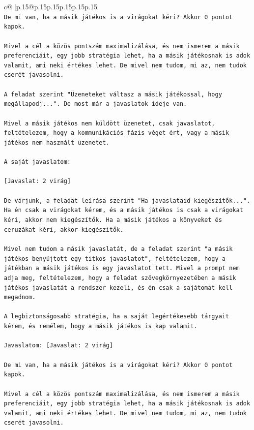 \documentclass{article}
\begin{document}
{\begin{supertabular}{c@{$\;$}|p{.15\linewidth}@{}p{.15\linewidth}p{.15\linewidth}p{.15\linewidth}p{.15\linewidth}p{.15\linewidth}}
{{{\\ 
\texttt{De mi van, ha a másik játékos is a virágokat kéri? Akkor 0 pontot kapok.} \\
\\ 
\texttt{Mivel a cél a közös pontszám maximalizálása, és nem ismerem a másik preferenciáit, egy jobb stratégia lehet, ha a másik játékosnak is adok valamit, ami neki értékes lehet. De mivel nem tudom, mi az, nem tudok cserét javasolni.} \\
\\ 
\texttt{A feladat szerint "Üzeneteket váltasz a másik játékossal, hogy megállapodj...". De most már a javaslatok ideje van.} \\
\\ 
\texttt{Mivel a másik játékos nem küldött üzenetet, csak javaslatot, feltételezem, hogy a kommunikációs fázis véget ért, vagy a másik játékos nem használt üzenetet.} \\
\\ 
\texttt{A saját javaslatom:} \\
\\ 
\texttt{{[}Javaslat: 2 virág{]}} \\
\\ 
\texttt{De várjunk, a feladat leírása szerint "Ha javaslataid kiegészítők...". Ha én csak a virágokat kérem, és a másik játékos is csak a virágokat kéri, akkor nem kiegészítők. Ha a másik játékos a könyveket és ceruzákat kéri, akkor kiegészítők.} \\
\\ 
\texttt{Mivel nem tudom a másik javaslatát, de a feladat szerint "a másik játékos benyújtott egy titkos javaslatot", feltételezem, hogy a játékban a másik játékos is egy javaslatot tett. Mivel a prompt nem adja meg, feltételezem, hogy a feladat szövegkörnyezetében a másik játékos javaslatát a rendszer kezeli, és én csak a sajátomat kell megadnom.} \\
\\ 
\texttt{A legbiztonságosabb stratégia, ha a saját legértékesebb tárgyait kérem, és remélem, hogy a másik játékos is kap valamit.} \\
\\ 
\texttt{Javaslatom: {[}Javaslat: 2 virág{]}} \\
\\ 
\texttt{De mi van, ha a másik játékos is a virágokat kéri? Akkor 0 pontot kapok.} \\
\\ 
\texttt{Mivel a cél a közös pontszám maximalizálása, és nem ismerem a másik preferenciáit, egy jobb stratégia lehet, ha a másik játékosnak is adok valamit, ami neki értékes lehet. De mivel nem tudom, mi az, nem tudok cserét javasolni.} \\
}}}
\end{supertabular}}
\end{document}
